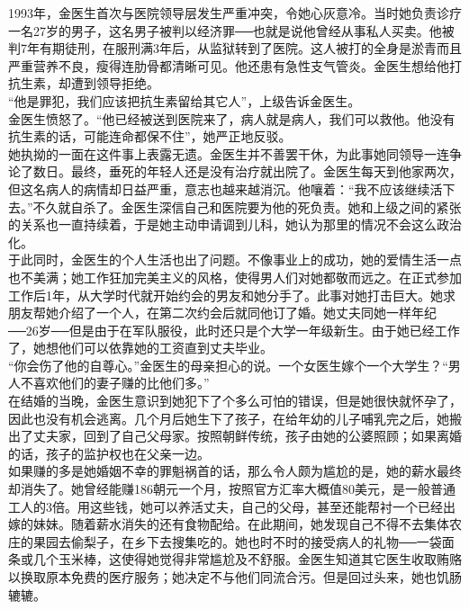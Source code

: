 1993年，金医生首次与医院领导层发生严重冲突，令她心灰意冷。当时她负责诊疗一名27岁的男子，这名男子被判以经济罪──也就是说他曾经从事私人买卖。他被判7年有期徒刑，在服刑满3年后，从监狱转到了医院。这人被打的全身是淤青而且严重营养不良，瘦得连肋骨都清晰可见。他还患有急性支气管炎。金医生想给他打抗生素，却遭到领导拒绝。\\

“他是罪犯，我们应该把抗生素留给其它人”，上级告诉金医生。\\

金医生愤怒了。“他已经被送到医院来了，病人就是病人，我们可以救他。他没有抗生素的话，可能连命都保不住”，她严正地反驳。\\

她执拗的一面在这件事上表露无遗。金医生并不善罢干休，为此事她同领导一连争论了数日。最终，垂死的年轻人还是没有治疗就出院了。金医生每天到他家两次，但这名病人的病情却日益严重，意志也越来越消沉。他嚷着：“我不应该继续活下去。”不久就自杀了。金医生深信自己和医院要为他的死负责。她和上级之间的紧张的关系也一直持续着，于是她主动申请调到儿科，她认为那里的情况不会这么政治化。\\

于此同时，金医生的个人生活也出了问题。不像事业上的成功，她的爱情生活一点也不美满；她工作狂加完美主义的风格，使得男人们对她都敬而远之。在正式参加工作后1年，从大学时代就开始约会的男友和她分手了。此事对她打击巨大。她求朋友帮她介绍了一个人，在第二次约会后就同他订了婚。她丈夫同她一样年纪──26岁──但是由于在军队服役，此时还只是个大学一年级新生。由于她已经工作了，她想他们可以依靠她的工资直到丈夫毕业。\\

“你会伤了他的自尊心。”金医生的母亲担心的说。一个女医生嫁个一个大学生？“男人不喜欢他们的妻子赚的比他们多。”\\

在结婚的当晚，金医生意识到她犯下了个多么可怕的错误，但是她很快就怀孕了，因此也没有机会逃离。几个月后她生下了孩子，在给年幼的儿子哺乳完之后，她搬出了丈夫家，回到了自己父母家。按照朝鲜传统，孩子由她的公婆照顾；如果离婚的话，孩子的监护权也在父亲一边。\\

如果赚的多是她婚姻不幸的罪魁祸首的话，那么令人颇为尴尬的是，她的薪水最终却消失了。她曾经能赚186朝元一个月，按照官方汇率大概值80美元，是一般普通工人的3倍。用这些钱，她可以养活丈夫，自己的父母，甚至还能帮衬一个已经出嫁的妹妹。随着薪水消失的还有食物配给。在此期间，她发现自己不得不去集体农庄的果园去偷梨子，在乡下去搜集吃的。她也时不时的接受病人的礼物──一袋面条或几个玉米棒，这使得她觉得非常尴尬及不舒服。金医生知道其它医生收取贿赂以换取原本免费的医疗服务；她决定不与他们同流合污。但是回过头来，她也饥肠辘辘。\\

